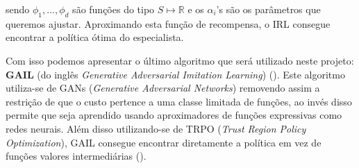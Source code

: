 sendo $\phi_1, ..., \phi_d$ são funções do tipo $S \mapsto \mathbb{R}$ e os $\alpha_i$'s são os parâmetros que queremos ajustar. Aproximando esta função de recompensa, o IRL consegue encontrar a política ótima do especialista.

Com isso podemos apresentar o último algoritmo que será utilizado neste projeto: \textbf{GAIL} (do inglês \textit{Generative Adversarial Imitation Learning}) (). Este algoritmo utiliza-se de GANs (\textit{Generative Adversarial Networks}) removendo assim a restrição de que o custo pertence a uma classe limitada de funções, ao invés disso permite que seja aprendido usando aproximadores de funções expressivas como redes neurais. Além disso utilizando-se de TRPO (\textit{Trust Region Policy Optimization}), GAIL consegue encontrar diretamente a política em vez de funções valores intermediárias ().